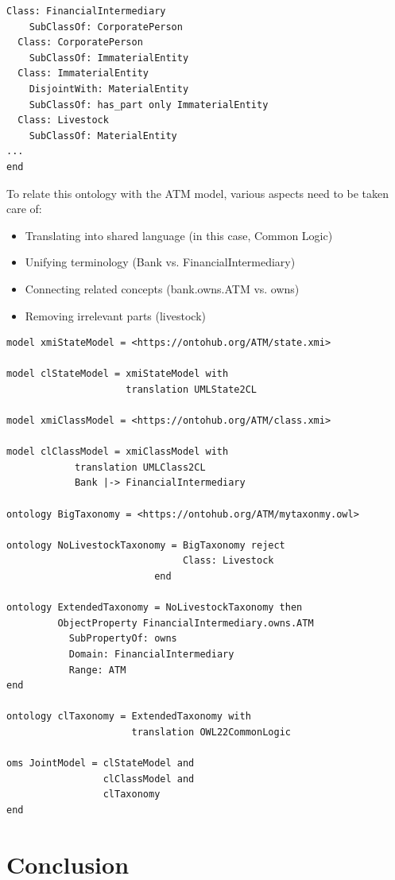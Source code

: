 \documentclass[10pt,fleqn,final]{scrreprt}
\newenvironment{definitions}[0]{\medskip }{}
\begin{document}
\begin{definitions}
\begin{lstlisting}[basicstyle=\ttfamily,language=dolText,alsolanguage=owl2Manchester,escapechar=@,mathescape]
  Class: FinancialIntermediary
    SubClassOf: CorporatePerson 
  Class: CorporatePerson
    SubClassOf: ImmaterialEntity
  Class: ImmaterialEntity
    DisjointWith: MaterialEntity
    SubClassOf: has_part only ImmaterialEntity
  Class: Livestock 	
    SubClassOf: MaterialEntity 
...
end
\end{lstlisting}

 To relate this ontology with the ATM model, 
various aspects need to be taken care of:
\begin{itemize}
  \item Translating into shared language  (in this case, Common Logic)
  \item Unifying terminology (Bank vs. FinancialIntermediary)
  \item Connecting related concepts (bank.owns.ATM vs. owns)
  \item Removing irrelevant parts (livestock) 
\end{itemize}

\begin{lstlisting}[basicstyle=\ttfamily\small,language=dolText,alsolanguage=owl2Manchester,escapechar=@,mathescape]
model xmiStateModel = <https://ontohub.org/ATM/state.xmi>

model clStateModel = xmiStateModel with
                     translation UMLState2CL

model xmiClassModel = <https://ontohub.org/ATM/class.xmi>			

model clClassModel = xmiClassModel with 
            translation UMLClass2CL 
            Bank |-> FinancialIntermediary

ontology BigTaxonomy = <https://ontohub.org/ATM/mytaxonmy.owl>			

ontology NoLivestockTaxonomy = BigTaxonomy reject
                               Class: Livestock
						  end

ontology ExtendedTaxonomy = NoLivestockTaxonomy then 
         ObjectProperty FinancialIntermediary.owns.ATM
           SubPropertyOf: owns 
           Domain: FinancialIntermediary 
           Range: ATM
end

ontology clTaxonomy = ExtendedTaxonomy with 
                      translation OWL22CommonLogic

oms JointModel = clStateModel and 
                 clClassModel and 
                 clTaxonomy
end
\end{lstlisting}

\section{Conclusion}


\end{definitions}
\end{document}
